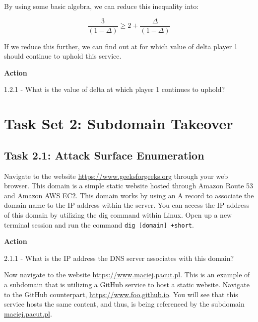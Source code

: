 \documentclass[letterpaper,12pt]{report}
\begin{document}
By using some basic algebra, we can reduce this inequality into:

\[ \frac{3}{(1 - \Delta)} \geq 2 + \frac{\Delta}{(1 - \Delta)} \]

If we reduce this further, we can find out at for which value of delta player 1 should continue to uphold this service.

\bigskip
\begin{mdframed}[backgroundcolor=blue!10,style=code,nobreak=true,align=center,userdefinedwidth=14cm]
    \textbf{Action}
    \bigskip
    
    1.2.1 - What is the value of delta at which player 1 continues to uphold?
\end{mdframed}


\section*{Task Set 2: Subdomain Takeover}\label{sec:Task Set 2: Subdomain Takeover}
\bigskip
{}

\subsection*{Task 2.1: Attack Surface Enumeration}

Navigate to the website \url{https://www.geeksforgeeks.org} through your web browser. This domain is a simple static website hosted through Amazon Route 53 and Amazon AWS EC2. This domain works by using an A record to associate the domain name to the IP address within the server. You can access the IP address of this domain by utilizing the dig command within Linux. Open up a new terminal session and run the command \texttt{dig [domain] +short}.

\bigskip
\begin{mdframed}[backgroundcolor=blue!10,style=code,nobreak=true,align=center,userdefinedwidth=14cm]
    \textbf{Action}
    \bigskip
    
    2.1.1 - What is the IP address the DNS server associates with this domain?
\end{mdframed}

Now navigate to the website \url{https://www.maciej.pacut.pl}. This is an example of a subdomain that is utilizing a GitHub service to host a static website. Navigate to the GitHub counterpart, \url{https://www.foo.github.io}. You will see that this service hosts the same content, and thus, is being referenced by the subdomain \url{maciej.pacut.pl}. 
\end{document}
